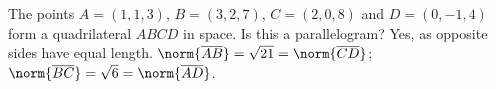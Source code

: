{The points $A=(1,1,3)$, $B=(3,2,7)$, $C=(2,0,8)$ and $D = (0,-1,4)$ form a quadrilateral $ABCD$ in space. Is this a parallelogram?
}
{Yes, as opposite sides have equal length. $\norm{\overline{AB}} = \sqrt{21}=\norm{\overline{CD}}$; $\norm{\overline{BC}} = \sqrt{6}=\norm{\overline{AD}}$.
}
